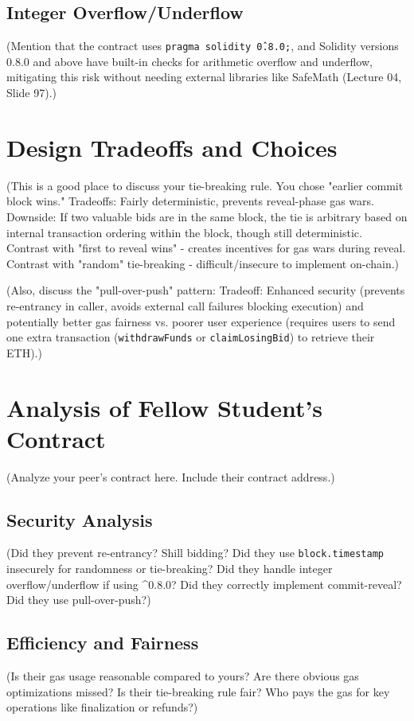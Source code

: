 \documentclass[11pt, a4paper]{article}
\begin{document}
\subsection{Integer Overflow/Underflow}
(Mention that the contract uses \texttt{pragma solidity \^0.8.0;}, and Solidity versions 0.8.0 and above have built-in checks for arithmetic overflow and underflow, mitigating this risk without needing external libraries like SafeMath (Lecture 04, Slide 97).)


\section{Design Tradeoffs and Choices}
(This is a good place to discuss your tie-breaking rule. You chose "earlier commit block wins." Tradeoffs: Fairly deterministic, prevents reveal-phase gas wars. Downside: If two valuable bids are in the same block, the tie is arbitrary based on internal transaction ordering within the block, though still deterministic. Contrast with "first to reveal wins" - creates incentives for gas wars during reveal. Contrast with "random" tie-breaking - difficult/insecure to implement on-chain.)

(Also, discuss the "pull-over-push" pattern: Tradeoff: Enhanced security (prevents re-entrancy in caller, avoids external call failures blocking execution) and potentially better gas fairness vs. poorer user experience (requires users to send one extra transaction (\texttt{withdrawFunds} or \texttt{claimLosingBid}) to retrieve their ETH).)


\section{Analysis of Fellow Student's Contract}
(Analyze your peer's contract here. Include their contract address.)

\subsection{Security Analysis}
(Did they prevent re-entrancy? Shill bidding? Did they use \texttt{block.timestamp} insecurely for randomness or tie-breaking? Did they handle integer overflow/underflow if using ^0.8.0? Did they correctly implement commit-reveal? Did they use pull-over-push?)

\subsection{Efficiency and Fairness}
(Is their gas usage reasonable compared to yours? Are there obvious gas optimizations missed? Is their tie-breaking rule fair? Who pays the gas for key operations like finalization or refunds?)
\end{document}
